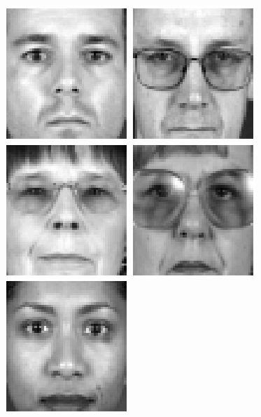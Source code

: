 \begin{figure}[ht]
\begin{center}
\includegraphics[scale=0.12]{ch4/figures/XM2VTS_31.png}
\includegraphics[scale=0.12]{ch4/figures/XM2VTS_32.png}\\
\includegraphics[scale=0.12]{ch4/figures/XM2VTS_33.png}
\includegraphics[scale=0.12]{ch4/figures/XM2VTS_34.png}
\includegraphics[scale=0.12]{ch4/figures/XM2VTS_35.png}

\end{center}
\end{figure}
